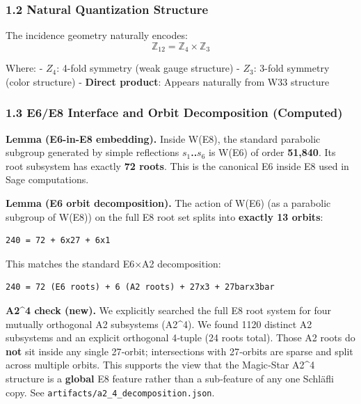 \documentclass[11pt]{article}
\begin{document}
\subsubsection{1.2 Natural Quantization
Structure}\label{natural-quantization-structure}

The incidence geometry naturally encodes:
\[\mathbb{Z}_{12} = \mathbb{Z}_4 \times \mathbb{Z}_3\]

Where: - \textbf{\(Z_{4}\)}: 4-fold symmetry (weak gauge structure) -
\textbf{\(Z_{3}\)}: 3-fold symmetry (color structure) - \textbf{Direct
product}: Appears naturally from W33 structure

\subsubsection{1.3 E6/E8 Interface and Orbit Decomposition
(Computed)}\label{e6e8-interface-and-orbit-decomposition-computed}

\textbf{Lemma (E6-in-E8 embedding).} Inside W(E8), the standard
parabolic subgroup generated by simple reflections
\textbf{\(s_{1}\)..\(s_{6}\)} is W(E6) of order \textbf{51,840}. Its
root subsystem has exactly \textbf{72 roots}. This is the canonical E6
inside E8 used in Sage computations.

\textbf{Lemma (E6 orbit decomposition).} The action of W(E6) (as a
parabolic subgroup of W(E8)) on the full E8 root set splits into
\textbf{exactly 13 orbits}:

\begin{verbatim}
240 = 72 + 6x27 + 6x1
\end{verbatim}

This matches the standard E6\ensuremath{\times}A2 decomposition:

\begin{verbatim}
240 = 72 (E6 roots) + 6 (A2 roots) + 27x3 + 27barx3bar
\end{verbatim}

\textbf{A2\^{}4 check (new).} We explicitly searched the full E8 root
system for four mutually orthogonal A2 subsystems (A2\^{}4). We found
1120 distinct A2 subsystems and an explicit orthogonal 4‑tuple (24 roots
total). Those A2 roots do \textbf{not} sit inside any single 27‑orbit;
intersections with 27‑orbits are sparse and split across multiple
orbits. This supports the view that the Magic‑Star A2\^{}4 structure is
a \textbf{global} E8 feature rather than a sub‑feature of any one
Schläfli copy. See \texttt{artifacts/a2\_4\_decomposition.json}.
\end{document}
